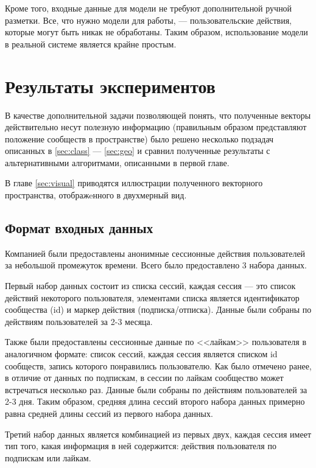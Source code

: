 \documentclass[times,specification,annotation]{itmo-student-thesis}
\begin{document}
Кроме того, входные данные для модели не требуют дополнительной ручной разметки. Все, что нужно модели для работы, --- пользовательские действия, которые могут быть никак не обработаны. Таким образом, использование модели в реальной системе является крайне простым.

\chapter{Результаты экспериментов}\label{experiments}

В качестве дополнительной задачи позволяющей понять, что полученные
векторы действительно несут полезную информацию (правильным образом
представляют положение сообществ в пространстве) было решено несколько подзадач
описанных в \ref{sec:class} --- \ref{sec:geo} и сравнил полученные результаты с альтернативными
алгоритмами, описанными в первой главе. 

В главе \ref{sec:visual} приводятся иллюстрации полученного векторного пространства, отображeнного в двухмерный вид.

\section{Формат входных данных}\label{sec:data-format}

Компанией были предоставлены анонимные сессионные действия пользователей за небольшой промежуток времени. Всего было предоставлено 3 набора данных.

Первый набор данных состоит из списка сессий, каждая сессия --- это список действий некоторого пользователя, элементами списка является идентификатор сообщества (id) и маркер действия (подписка/отписка). Данные были собраны по действиям пользователей за 2-3 месяца.

Также были предоставлены сессионные данные по <<лайкам>> пользователя в аналогичном формате: список сессий, каждая сессия является списком id сообществ, запись которого понравились пользователю. Как было отмечено ранее, в отличие от данных по подпискам, в сессии по лайкам сообщество может встречаться несколько раз. Данные были собраны по действиям пользователей за 2-3 дня. Таким образом, средняя длина сессий второго набора данных примерно равна средней длины сессий из первого набора данных. 

Третий набор данных является комбинацией из первых двух, каждая сессия имеет тип того, какая информация в ней содержится: действия пользователя по подпискам или лайкам. 
\end{document}
